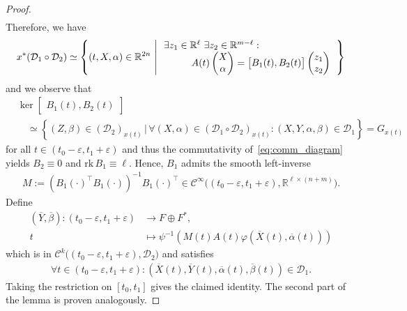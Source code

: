 \documentclass[preprint,12pt]{elsarticle}
\theoremstyle{definition}
\newcommand{\rk}{\mathrm{rk}\,}
\newcommand{\set}[1]{\left\lbrace #1\right\rbrace}
\begin{document}
\begin{proof}
\begin{align*}
\end{align*}
Therefore, we have
\begin{align*}
x^*(\mathcal{D}_1\circ\mathcal{D}_2) \simeq \set{(t,X,\alpha)\in\mathbb{R}^{2n}\,\left\vert\,\begin{array}{l}\exists z_1\in\mathbb{R}^{\ell}~\exists z_2\in\mathbb{R}^{m-\ell}:\\
\hspace*{1cm} A(t)\begin{pmatrix}
X\\\alpha
\end{pmatrix} = \begin{bmatrix}B_1(t), B_2(t)\end{bmatrix}\begin{pmatrix}
z_1\\z_2
\end{pmatrix}
\end{array}\right.}
\end{align*}
and we observe that
\begin{align*}
& \ker \begin{bmatrix}B_1(t), B_2(t)\end{bmatrix}\\
&\quad \simeq \set{(Z,\beta)\in(\mathcal{D}_2)_{x(t)}\,\big\vert\,\forall (X,\alpha)\in(\mathcal{D}_1\circ\mathcal{D}_2)_{x(t)}:(X,Y,\alpha,\beta)\in\mathcal{D}_1} = G_{x(t)}
\end{align*}
for all $t\in(t_0-\varepsilon,t_1+\varepsilon)$ and thus the commutativity of~\eqref{eq:comm_diagram} yields $B_2\equiv 0$ and $\rk B_1\equiv \ell$. Hence,  $B_1$ admits the smooth left-inverse
\begin{align*}
M := (B_1(\cdot)^\top B_1(\cdot))^{-1}B_1(\cdot)^\top\in\mathcal{C}^\infty\big((t_0-\varepsilon,t_1+\varepsilon),\mathbb{R}^{\ell\times(n+m)}\big).
\end{align*}
Define
\begin{align*}
(\overline{Y},\overline{\beta}):(t_0-\varepsilon,t_1+\varepsilon) & \to F\oplus F^*,\\
t & \mapsto \psi^{-1}\left(M(t)A(t)\varphi\left(\overline{X}(t),\overline{\alpha}(t)\right)\right)
\end{align*}
which is in $\mathcal{C}^k\big((t_0-\varepsilon,t_1+\varepsilon),\mathcal{D}_2\big)$ and satisfies
\begin{align*}
\forall t\in (t_0-\varepsilon,t_1+\varepsilon): \left(\overline{X}(t),\overline{Y}(t),\overline{\alpha}(t),\overline{\beta}(t)\right)\in\mathcal{D}_1.
\end{align*}
Taking the restriction on $[t_0,t_1]$ gives the claimed identity. The second part of the lemma is proven analogously.
\end{proof}
\end{document}
